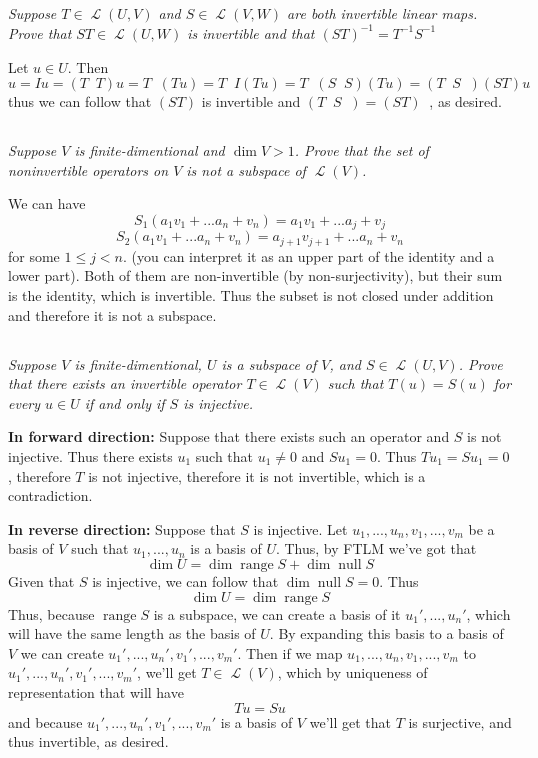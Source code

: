 \documentclass[11pt,oneside,titlepage]{book}
\DeclareMathOperator \map {\mathcal {L}}
\DeclareMathOperator \ns {null}
\DeclareMathOperator \range {range}
\DeclareMathOperator \inv {^{-1}}
\begin{document}
\subsection{}

\textit{Suppose $T \in \map (U, V)$ and $S \in \map (V, W)$ are both invertible linear maps.
  Prove that $ST \in \map(U, W)$ is invertible and that $(ST)^{-1} = T^{-1} S^{-1}$}

Let $u \in U$. Then
$$u = Iu = (T \inv T) u = T \inv (T u) = T \inv I (T u) = T \inv (S \inv S) (T u) =
(T \inv S \inv) (S T) u $$
thus we can follow that $(ST)$ is invertible and $(T \inv S \inv) = (ST) \inv$, as desired.

\subsection{}

\textit{Suppose $V$ is finite-dimentional and $\dim V > 1$. Prove that the set of
  noninvertible operators on $V$ is not a subspace of $\map(V)$.}

We can have
$$S_1(a_1 v_1 + ... a_n + v_n) = a_1 v_1 + ... a_j + v_j$$
$$S_2(a_1 v_1 + ... a_n + v_n) = a_{j + 1} v_{j + 1} + ... a_n + v_n$$
for some $1 \leq j < n$. (you can interpret it as an upper part of the identity and a lower
part). Both of them are non-invertible (by non-surjectivity), but their sum is the identity,
which is invertible. Thus the subset is not closed under addition and therefore it is not a
subspace.

\subsection{}

\textit{Suppose $V$ is finite-dimentional, $U$ is a subspace of $V$, and $S \in \map (U, V)$.
  Prove that there exists an invertible operator $T \in \map(V)$ such that $T(u) = S(u)$ for
  every $u \in U$ if and only if $S$ is injective.}

\textbf{In forward direction: }
Suppose that there exists such an operator and $S$ is not injective. Thus there exists
$u_1$ such that $u_1 \neq 0$ and $S u_1 = 0$. Thus $T u_1 = S u_1 = 0$, therefore
$T$ is not injective, therefore it is not invertible, which is a contradiction.

\textbf{In reverse direction: }
Suppose that $S$ is injective. Let $u_1, ..., u_n, v_1, ..., v_m$ be a basis of $V$ such
that $u_1, ..., u_n$ is a basis of $U$. Thus, by FTLM we've got that 
$$\dim U  = \dim \range S + \dim \ns S$$
Given that $S$ is injective, we can follow that $\dim \ns S = 0$. Thus
$$\dim U  = \dim \range S$$
Thus, because $\range S$ is a subspace,  we can create a basis of it
$u_1', ..., u_n'$, which will have the same length as the basis of $U$. By expanding this basis
to a basis of $V$ we can create $u_1', ..., u_n', v_1', ..., v_m'$.
Then if we map $u_1, ..., u_n, v_1, ..., v_m$ to $u_1', ..., u_n', v_1', ..., v_m'$, we'll
get $T \in \map(V)$, which  by uniqueness of representation that will have
$$Tu = Su$$
and because $u_1', ..., u_n', v_1', ..., v_m'$ is a basis of $V$ we'll get that $T$ is
surjective, and thus invertible, as desired.
\end{document}
